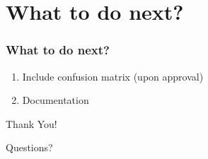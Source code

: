 \documentclass{beamer}
\begin{document}
\section{What to do next?}
\begin{frame}
	\frametitle{What to do next?}
	\begin{enumerate}
		\item Include confusion matrix (upon approval)
		\item Documentation
	\end{enumerate}
\end{frame}
\begin{frame}%
\begin{center}
{\fontsize{40}{50}\selectfont Thank You!}
\end{center}
\begin{center}
	\Huge Questions?
\end{center}
\end{frame}
\end{document}
